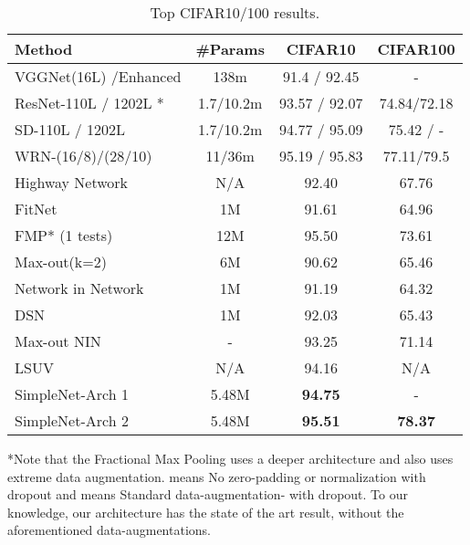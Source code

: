 \documentclass{article} \usepackage{lets_keepit_simple,times}
\begin{document}
\begin{table}[H]
\centering
\caption{Top CIFAR10/100 results.}
\label{tab:cifar}
\begin{tabular}{lccc}
\textbf{Method}  & \textbf{\#Params}   & \textbf{CIFAR10}       & \textbf{CIFAR100}      \\ \hline
VGGNet(16L) \cite{Sergey_CIFAR10_OnTorch_2015}/Enhanced  & 138m   & 91.4 / 92.45  & -             \\ ResNet-110L / 1202L \cite{He_ResNet_2015} *   & 1.7/10.2m & 93.57 / 92.07 & 74.84/72.18 \\ SD-110L / 1202L \cite{Huang_DeepNN_StochDepth_2016} & 1.7/10.2m & 94.77 / 95.09 & 75.42 / -     \\ WRN-(16/8)/(28/10) \cite{Zagoruyko_WRN_2016} & 11/36m    & 95.19 / 95.83 & 77.11/79.5  \\ Highway Network \cite{Srivastava_HighwayNets_2015}  & N/A   & 92.40  & 67.76    \\ FitNet \cite{Romero_Fitnet_2014}   & 1M  & 91.61  & 64.96   \\ FMP* (1 tests) \cite{Graham_FractionalMaxpooling_2014}     & 12M    & 95.50   & 73.61         \\ Max-out(k=2) \cite{Goodfellow_MaxoutNetwork_2013}    & 6M  & 90.62   & 65.46         \\ Network in Network \cite{Lin_NIN_2013}   & 1M   & 91.19    & 64.32   \\ DSN \cite{Lee_DeeplySupervisedNet_2015}   & 1M   & 92.03   & 65.43         \\ Max-out NIN \cite{JiaRen_BatchNormMaxoutNIN_2015}    & -     & 93.25         & 71.14         \\ LSUV \cite{Mishkin_AllYouNeedIsGoodInit_2016}    & N/A    & 94.16    & N/A     \\ SimpleNet-Arch 1       & 5.48M      & \textbf{94.75}   & -         \\ 
SimpleNet-Arch 2      & 5.48M      & \textbf{95.51}   & \textbf{78.37}         \\ \hline
\end{tabular}
\end{table}

*Note that the Fractional Max Pooling \cite{Graham_FractionalMaxpooling_2014} uses a deeper architecture and also uses extreme data augmentation.   means No zero-padding or normalization with dropout and  means Standard data-augmentation- with dropout. To our knowledge, our architecture has the state of the art result, without the aforementioned data-augmentations.
\end{document}
